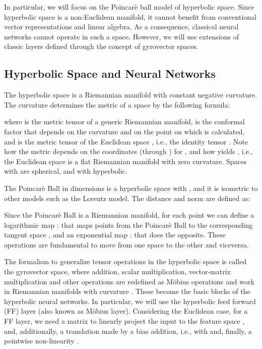 \documentclass{article}
\begin{document}
In particular, we will focus on the Poincarè ball model of hyperbolic space. Since hyperbolic space is a non-Euclidean manifold, it cannot benefit from conventional vector representations and linear algebra. As a consequence, classical neural networks cannot operate in such a space. However, we will use extensions \cite{ganea2018hyperbolic} of classic layers defined through the concept of gyrovector spaces. 


\subsection{Hyperbolic Space and Neural Networks}\label{sec:hyperbolic_nn}
The hyperbolic space is a Riemannian manifold with constant negative curvature. The curvature determines the metric of a space by the following formula:
    


where  is the metric tensor of a generic Riemannian manifold,  is the conformal factor that depends on the curvature  and on the point  on which is calculated, and  is the metric tensor of the Euclidean space , i.e., the identity tensor . Note how the metric depends on the coordinates (through ) for , and how  yields , i.e., the Euclidean space is a flat Riemannian manifold with zero curvature. Spaces with  are spherical, and with  hyperbolic.

The Poincarè Ball in  dimensions  is a hyperbolic space with , and it is isometric to other models such as the Lorentz model. The distance and norm are defined as:



Since the Poincarè Ball is a Riemannian manifold, for each point  we can define a logarithmic map  :  that maps points from the Poincarè Ball to the corresponding tangent space , and an exponential map  :  that does the opposite. These operations \cite{ganea2018hyperbolic} are fundamental to move from one space to the other and viceversa.

The formalism to generalize tensor operations in the hyperbolic space is called the gyrovector space, where addition, scalar multiplication, vector-matrix multiplication and other operations are redefined as M\"{o}bius operations and work in Riemannian manifolds with curvature . These become the basic blocks of the hyperbolic neural networks. In particular, we will use the hyperbolic feed forward (FF) layer (also known as M\"{o}bius layer).
Considering the Euclidean case, for a FF layer, we need a matrix  to linearly project the input  to the feature space , and, additionally, a translation made by a bias addition, i.e.,  with  and, finally, a pointwise non-linearity .
\end{document}
